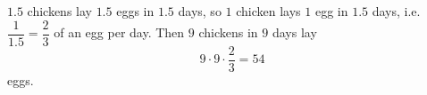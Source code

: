 $1.5$ chickens lay $1.5$ eggs in $1.5$ days, so $1$ chicken lays $1$ egg in $1.5$ days, i.e.\ $\dfrac{1}{1.5}=\dfrac{2}{3}$ of an egg per day. Then $9$ chickens in $9$ days lay
\[
9\cdot9\cdot\dfrac{2}{3}=\boxed{54}
\]
eggs.

